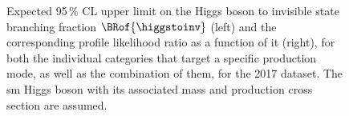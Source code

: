 \begin{figure}[htbp]
    \caption[Expected 95\,\% CL upper limit on the Higgs boson to invisible state branching fraction $\BRof{\higgstoinv}$ and the corresponding profile likelihood ratio as a function of it, for both the individual categories that target a specific production mode, as well as the combination of them, for the 2017 dataset]{Expected 95\,\% CL upper limit on the Higgs boson to invisible state branching fraction $\BRof{\higgstoinv}$ (left) and the corresponding profile likelihood ratio as a function of it (right), for both the individual categories that target a specific production mode, as well as the combination of them, for the 2017 dataset. The \acrlong{sm} Higgs boson with its associated mass and production cross section are assumed.}
    \label{fig:htoinv_limit_likelihood_2017}
\end{figure}

